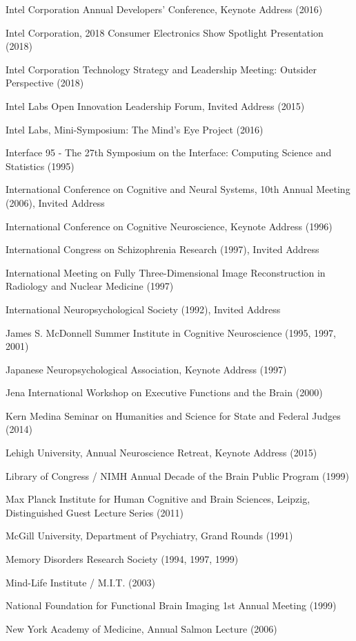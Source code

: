 \documentclass[10 pt]{article}
\begin{document}
Intel Corporation Annual Developers’ Conference, Keynote Address (2016)

Intel Corporation, 2018 Consumer Electronics Show Spotlight Presentation (2018)

Intel Corporation Technology Strategy and Leadership Meeting: Outsider Perspective (2018)

Intel Labs Open Innovation Leadership Forum, Invited Address (2015)

Intel Labs, Mini-Symposium: The Mind’s Eye Project (2016)

Interface 95 - The 27th Symposium on the Interface: Computing Science and Statistics (1995)

International Conference on Cognitive and Neural Systems, 10th Annual Meeting (2006), Invited Address

International Conference on Cognitive Neuroscience, Keynote Address (1996)

International Congress on Schizophrenia Research (1997), Invited Address

International Meeting on Fully Three-Dimensional Image Reconstruction in Radiology and Nuclear Medicine (1997)

International Neuropsychological Society (1992), Invited Address

James S. McDonnell Summer Institute in Cognitive Neuroscience (1995, 1997, 2001)

Japanese Neuropsychological Association, Keynote Address (1997)

Jena International Workshop on Executive Functions and the Brain (2000)

Kern Medina Seminar on Humanities and Science for State and Federal Judges (2014)

Lehigh University, Annual Neuroscience Retreat, Keynote Address (2015)

Library of Congress / NIMH Annual Decade of the Brain Public Program (1999)

Max Planck Institute for Human Cognitive and Brain Sciences, Leipzig, Distinguished Guest Lecture Series (2011)

McGill University, Department of Psychiatry, Grand Rounds (1991)

Memory Disorders Research Society (1994, 1997, 1999)

Mind-Life Institute / M.I.T. (2003)

National Foundation for Functional Brain Imaging 1st Annual Meeting (1999)

New York Academy of Medicine, Annual Salmon Lecture (2006)
\end{document}
